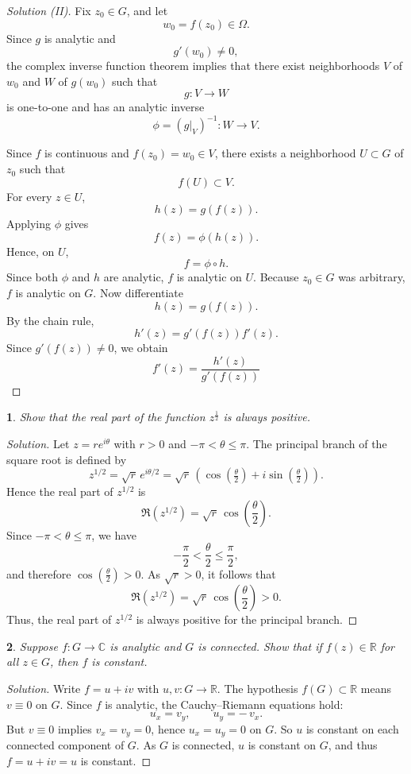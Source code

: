 \documentclass[12pt, a4paper]{report}
\theoremstyle{spaced}
\newtheorem{exercise}{}
\newcommand{\setexercise}[1]{\setcounter{exercise}{#1-1}}
\begin{document}
\begin{proof}[Solution (II)]
	Fix $z_0\in G$, and let
	\[
		w_0=f(z_0)\in\Omega.
	\]
	Since $g$ is analytic and
	\[
		g'(w_0)\neq 0,
	\]
	the complex inverse function theorem implies that there exist neighborhoods
	$V$ of $w_0$ and $W$ of $g(w_0)$ such that
	\[
		g:V\to W
	\]
	is one-to-one and has an analytic inverse
	\[
		\phi=(g|_V)^{-1}:W\to V.
	\]

	Since $f$ is continuous and $f(z_0)=w_0\in V$, there exists a neighborhood
	$U\subset G$ of $z_0$ such that
	\[
		f(U)\subset V.
	\]
	For every $z\in U$,
	\[
		h(z)=g(f(z)).
	\]
	Applying $\phi$ gives
	\[
		f(z)=\phi(h(z)).
	\]
	Hence, on $U$,
	\[
		f=\phi\circ h.
	\]
	Since both $\phi$ and $h$ are analytic, $f$ is analytic on $U$.
	Because $z_0\in G$ was arbitrary, $f$ is analytic on $G$.
	Now differentiate
	\[
		h(z)=g(f(z)).
	\]
	By the chain rule,
	\[
		h'(z)=g'(f(z))f'(z).
	\]
	Since $g'(f(z))\neq 0$, we obtain
	\[
		f'(z)=\frac{h'(z)}{g'(f(z))}
	\]
\end{proof}

\setexercise{12}
\begin{exercise}
	Show that the real part of the function \(z^{\frac{1}{2}}\) is always positive.
\end{exercise}
\begin{proof}[Solution]
	Let \(z = re^{i\theta}\) with \(r > 0\) and \(-\pi < \theta \leq \pi\).
	The principal branch of the square root is defined by
	\[
		z^{1/2} = \sqrt{r}\, e^{i\theta/2} = \sqrt{r}\,(\cos(\tfrac{\theta}{2}) + i\sin(\tfrac{\theta}{2})).
	\]
	Hence the real part of \(z^{1/2}\) is
	\[
		\Re(z^{1/2}) = \sqrt{r}\,\cos\!\left(\frac{\theta}{2}\right).
	\]
	Since \(-\pi < \theta \leq \pi\), we have
	\[
		-\frac{\pi}{2} < \frac{\theta}{2} \leq \frac{\pi}{2},
	\]
	and therefore \(\cos(\tfrac{\theta}{2}) > 0\).
	As \(\sqrt{r} > 0\), it follows that
	\[
		\Re(z^{1/2}) = \sqrt{r}\,\cos\!\left(\frac{\theta}{2}\right) > 0.
	\]
	Thus, the real part of \(z^{1/2}\) is always positive for the principal branch.
\end{proof}


\setexercise{14}
\begin{exercise}
	Suppose \(f:G\to\mathbb{C}\) is analytic and \(G\) is connected. Show that if \(f(z)\in\mathbb{R}\) for all \(z\in G\), then \(f\) is constant.
\end{exercise}

\begin{proof}[Solution]
	Write \(f=u+iv\) with \(u,v:G\to\mathbb{R}\). The hypothesis \(f(G)\subset\mathbb{R}\)
	means \(v\equiv 0\) on \(G\). Since \(f\) is analytic, the Cauchy--Riemann equations hold:
	\[
		u_x = v_y,\qquad u_y = -\,v_x .
	\]
	But \(v\equiv 0\) implies \(v_x=v_y=0\), hence \(u_x=u_y=0\) on \(G\). So \(u\) is constant on each connected component
	of \(G\). As \(G\) is connected, \(u\) is constant on \(G\), and thus \(f=u+iv=u\) is constant.

\end{proof}
\end{document}
